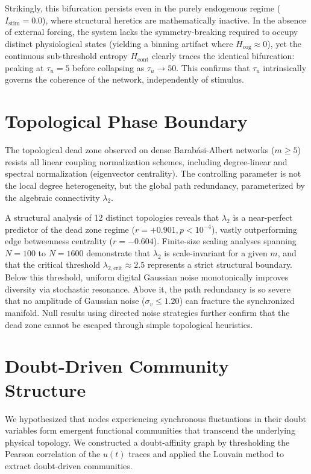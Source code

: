 \documentclass[11pt,a4paper]{article}
\begin{document}
Strikingly, this bifurcation persists even in the purely endogenous regime ($I_{\mathrm{stim}}=0.0$), where structural heretics are mathematically inactive. In the absence of external forcing, the system lacks the symmetry-breaking required to occupy distinct physiological states (yielding a binning artifact where $H_{\mathrm{cog}} \approx 0$), yet the continuous sub-threshold entropy $H_{\mathrm{cont}}$ clearly traces the identical bifurcation: peaking at $\tau_u = 5$ before collapsing as $\tau_u \to 50$. This confirms that $\tau_u$ intrinsically governs the coherence of the network, independently of stimulus.

\section{Topological Phase Boundary}
\label{sec:phase_boundary}
The topological dead zone observed on dense Barab\'asi-Albert networks ($m \geq 5$) resists all linear coupling normalization schemes, including degree-linear and spectral normalization (eigenvector centrality). The controlling parameter is not the local degree heterogeneity, but the global path redundancy, parameterized by the algebraic connectivity $\lambda_2$. 

A structural analysis of 12 distinct topologies reveals that $\lambda_2$ is a near-perfect predictor of the dead zone regime ($r = +0.901, p < 10^{-4}$), vastly outperforming edge betweenness centrality ($r = -0.604$). Finite-size scaling analyses spanning $N=100$ to $N=1600$ demonstrate that $\lambda_2$ is scale-invariant for a given $m$, and that the critical threshold $\lambda_{2,\mathrm{crit}} \approx 2.5$ represents a strict structural boundary. Below this threshold, uniform digital Gaussian noise monotonically improves diversity via stochastic resonance. Above it, the path redundancy is so severe that no amplitude of Gaussian noise ($\sigma_v \le 1.20$) can fracture the synchronized manifold. Null results using directed noise strategies further confirm that the dead zone cannot be escaped through simple topological heuristics.

\section{Doubt-Driven Community Structure}
\label{sec:communities}
We hypothesized that nodes experiencing synchronous fluctuations in their doubt variables form emergent functional communities that transcend the underlying physical topology. We constructed a doubt-affinity graph by thresholding the Pearson correlation of the $u(t)$ traces and applied the Louvain method to extract doubt-driven communities. 
\end{document}
